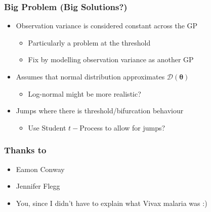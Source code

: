 \documentclass{beamer}
\begin{document}
\begin{frame}

\end{frame}

\begin{frame}
    \frametitle{Big Problem (Big Solutions?)}
    \begin{itemize}
        \item Observation variance is considered constant across the GP\begin{itemize}
                  \item Particularly a problem at the threshold
                  \item <2-> Fix by modelling observation variance as another GP
              \end{itemize}
              \item Assumes that normal distribution approximates $\mathcal{D}(\bm{\theta})$\begin{itemize}
                  \item Log-normal might be more realistic?
              \end{itemize}
              \item Jumps where there is threshold/bifurcation behaviour\begin{itemize}
                  \item Use Student $t-$Process to allow for jumps?
              \end{itemize}
    \end{itemize}
\end{frame}

\begin{frame}
    \frametitle{Thanks to}
    \begin{itemize}
        \item Eamon Conway
        \item Jennifer Flegg
        \item You, since I didn't have to explain what Vivax malaria was :)
    \end{itemize}
\end{frame}
\end{document}
